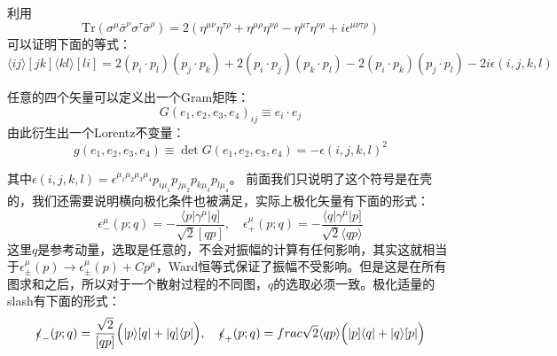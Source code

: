 利用
\begin{equation}
	\mathrm{Tr}(\sigma^{\mu}\bar{\sigma}^{\nu}\sigma^{\tau}\bar{\sigma}^{\rho})=2(\eta^{\mu\nu}\eta^{\tau\rho}+\eta^{\mu\rho}\eta^{\nu\rho}-\eta^{\mu\tau}\eta^{\nu\rho}+i\epsilon^{\mu\nu\tau\rho})
\end{equation}
可以证明下面的等式：
\begin{equation}
	\langle ij\rangle[jk]\langle kl\rangle[li]=2(p_i\cdot p_l)(p_j\cdot p_k)+2(p_i\cdot p_j)(p_k\cdot p_l)-2(p_i\cdot p_k)(p_j\cdot p_l)-2i\epsilon(i,j,k,l)
\end{equation}
\begin{definition}
	任意的四个矢量可以定义出一个Gram矩阵：
	\begin{equation}
		G(e_1,e_2,e_3,e_4)_{ij}\equiv e_i\cdot e_j
	\end{equation}
	由此衍生出一个Lorentz不变量：
	\begin{equation}
		g(e_1,e_2,e_3,e_4)\equiv\det G(e_1,e_2,e_3,e_4)=-\epsilon(i,j,k,l)^2
	\end{equation}
\end{definition}
其中$\epsilon(i,j,k,l)=\epsilon^{\mu_{1}\mu_{2}\mu_{3}\mu_{4}}p_{i\mu_{1}}p_{j\mu_{2}}p_{k\mu_{3}}p_{l\mu_{4}}$。
前面我们只说明了这个符号是在壳的，我们还需要说明横向极化条件也被满足，实际上极化矢量有下面的形式：
\begin{equation}
		\boxed{
			\epsilon_{-}^{\mu}(p;q)=-\frac{\langle p|\gamma^{\mu}|q]}{\sqrt{2}[qp]},\quad\epsilon_{+}^{\mu}(p;q)=-\frac{\langle q|\gamma^{\mu}|p]}{\sqrt{2}\langle qp\rangle}
		}
\end{equation}
这里$q$是参考动量，选取是任意的，不会对振幅的计算有任何影响，其实这就相当于$\epsilon_{\pm}^{\mu}(p)\to\epsilon_{\pm}^{\mu}(p)+Cp^{\mu}$，Ward恒等式保证了振幅不受影响。但是这是在所有图求和之后，所以对于一个散射过程的不同图，$q$的选取必须一致。极化适量的slash有下面的形式：
\begin{equation}
	\slashed{\epsilon}_-(p;q)=\frac{\sqrt{2}}{[qp]}\Big(|p\rangle[q|+|q]\langle p|\Big),\quad\slashed{\epsilon}_+(p;q)=frac{\sqrt{2}}{\langle qp\rangle}\Big(|p]\langle q|+|q\rangle[p|\Big)
\end{equation}
